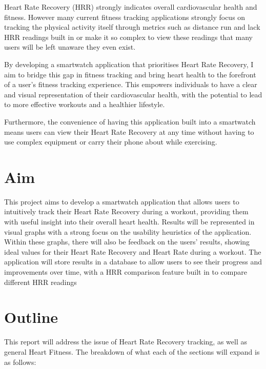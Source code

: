 \documentclass{l4proj}
\begin{document}
Heart Rate Recovery (HRR) strongly indicates overall cardiovascular health and fitness. However many current fitness tracking applications strongly focus on tracking the physical activity itself through metrics such as distance run and lack HRR readings built in or make it so complex to view these readings that many users will be left unaware they even exist. 

By developing a smartwatch application that prioritises Heart Rate Recovery, I aim to bridge this gap in fitness tracking and bring heart health to the forefront of a user’s fitness tracking experience. This empowers individuals to have a clear and visual representation of their cardiovascular health, with the potential to lead to more effective workouts and a healthier lifestyle.

Furthermore, the convenience of having this application built into a smartwatch means users can view their Heart Rate Recovery at any time without having to use complex equipment or carry their phone about while exercising.

\section{Aim}

This project aims to develop a smartwatch application that allows users to intuitively track their Heart Rate Recovery during a workout, providing them with useful insight into their overall heart health. Results will be represented in visual graphs with a strong focus on the usability heuristics of the application. Within these graphs, there will also be feedback on the users' results, showing ideal values for their Heart Rate Recovery and Heart Rate during a workout. The application will store results in a database to allow users to see their progress and improvements over time, with a HRR comparison feature built in to compare different HRR readings

\section{Outline}

This report will address the issue of Heart Rate Recovery tracking, as well as general Heart Fitness. The breakdown of what each of the sections will expand is as follows:
\end{document}
